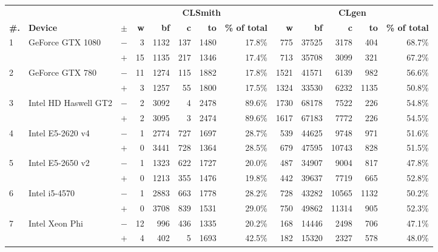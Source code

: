  \begin{tabular}{lll | rrrrr | rrrrr }
  \toprule
  & & & \multicolumn{5}{c|}{\textbf{CLSmith}} & \multicolumn{5}{c}{\textbf{CLgen}} \\
  \textbf{\#.} & \textbf{Device} & $\pm$ &
  \textbf{w} & \textbf{bf} & \textbf{c} & \textbf{to} & \textbf{\% of total} &
  \textbf{w} & \textbf{bf} & \textbf{c} & \textbf{to} & \textbf{\% of total} \\
  \midrule
  \multirow{ 2}{*}{1} & \multirow{ 2}{*}{GeForce GTX 1080} & $-$ & 3 & 1132 & 137 & 1480 & 17.8\%       & 775 & 37525 & 3178 & 404 & 68.7\% \\& & $+$ & 15 & 1135 & 217 & 1346 & 17.4\% & 713 & 35708 & 3099 & 321 & 67.2\% \\
\hline
\multirow{ 2}{*}{2} & \multirow{ 2}{*}{GeForce GTX 780} & $-$ & 11 & 1274 & 115 & 1882 & 17.8\%       & 1521 & 41571 & 6139 & 982 & 56.6\% \\& & $+$ & 3 & 1257 & 55 & 1800 & 17.5\% & 1324 & 33530 & 6232 & 1135 & 50.8\% \\
\hline
\multirow{ 2}{*}{3} & \multirow{ 2}{*}{Intel HD Haswell GT2} & $-$ & 2 & 3092 & 4 & 2478 & 89.6\%       & 1730 & 68178 & 7522 & 226 & 54.8\% \\& & $+$ & 2 & 3095 & 3 & 2474 & 89.6\% & 1617 & 67183 & 7772 & 226 & 54.5\% \\
\hline
\multirow{ 2}{*}{4} & \multirow{ 2}{*}{Intel E5-2620 v4} & $-$ & 1 & 2774 & 727 & 1697 & 28.7\%       & 539 & 44625 & 9748 & 971 & 51.6\% \\& & $+$ & 0 & 3441 & 728 & 1364 & 28.5\% & 679 & 47595 & 10743 & 828 & 51.5\% \\
\hline
\multirow{ 2}{*}{5} & \multirow{ 2}{*}{Intel E5-2650 v2} & $-$ & 1 & 1323 & 622 & 1727 & 20.0\%       & 487 & 34907 & 9004 & 817 & 47.8\% \\& & $+$ & 0 & 1213 & 355 & 1476 & 19.8\% & 442 & 39637 & 7719 & 665 & 52.8\% \\
\hline
\multirow{ 2}{*}{6} & \multirow{ 2}{*}{Intel i5-4570} & $-$ & 1 & 2883 & 663 & 1778 & 28.2\%       & 728 & 43282 & 10565 & 1132 & 50.2\% \\& & $+$ & 0 & 3708 & 839 & 1531 & 29.0\% & 750 & 49862 & 11314 & 905 & 52.3\% \\
\hline
\multirow{ 2}{*}{7} & \multirow{ 2}{*}{Intel Xeon Phi} & $-$ & 12 & 996 & 436 & 1335 & 20.2\%       & 168 & 14446 & 2498 & 706 & 47.1\% \\& & $+$ & 4 & 402 & 5 & 1693 & 42.5\% & 182 & 15320 & 2327 & 578 & 48.0\% \\

\end{tabular}
